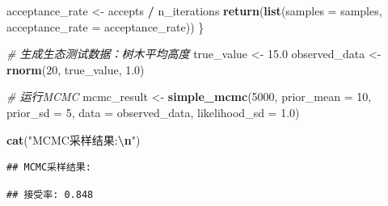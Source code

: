 \documentclass[
  twoside]{book}
\newenvironment{Shaded}{\begin{snugshade}}{\end{snugshade}}
\newcommand{\AttributeTok}[1]{\textcolor[rgb]{0.13,0.29,0.53}{#1}}
\newcommand{\CommentTok}[1]{\textcolor[rgb]{0.56,0.35,0.01}{\textit{#1}}}
\newcommand{\DecValTok}[1]{\textcolor[rgb]{0.00,0.00,0.81}{#1}}
\newcommand{\FloatTok}[1]{\textcolor[rgb]{0.00,0.00,0.81}{#1}}
\newcommand{\FunctionTok}[1]{\textcolor[rgb]{0.13,0.29,0.53}{\textbf{#1}}}
\newcommand{\NormalTok}[1]{#1}
\newcommand{\OtherTok}[1]{\textcolor[rgb]{0.56,0.35,0.01}{#1}}
\newcommand{\SpecialCharTok}[1]{\textcolor[rgb]{0.81,0.36,0.00}{\textbf{#1}}}
\newcommand{\StringTok}[1]{\textcolor[rgb]{0.31,0.60,0.02}{#1}}
\begin{document}
\begin{Shaded}
\begin{Highlighting}[]
\NormalTok{  acceptance\_rate }\OtherTok{\textless{}{-}}\NormalTok{ accepts }\SpecialCharTok{/}\NormalTok{ n\_iterations}
  \FunctionTok{return}\NormalTok{(}\FunctionTok{list}\NormalTok{(}\AttributeTok{samples =}\NormalTok{ samples, }\AttributeTok{acceptance\_rate =}\NormalTok{ acceptance\_rate))}
\NormalTok{\}}

\CommentTok{\# 生成生态测试数据：树木平均高度}
\NormalTok{true\_value }\OtherTok{\textless{}{-}} \FloatTok{15.0}
\NormalTok{observed\_data }\OtherTok{\textless{}{-}} \FunctionTok{rnorm}\NormalTok{(}\DecValTok{20}\NormalTok{, true\_value, }\FloatTok{1.0}\NormalTok{)}

\CommentTok{\# 运行MCMC}
\NormalTok{mcmc\_result }\OtherTok{\textless{}{-}} \FunctionTok{simple\_mcmc}\NormalTok{(}\DecValTok{5000}\NormalTok{, }\AttributeTok{prior\_mean =} \DecValTok{10}\NormalTok{, }\AttributeTok{prior\_sd =} \DecValTok{5}\NormalTok{,}
                           \AttributeTok{data =}\NormalTok{ observed\_data, }\AttributeTok{likelihood\_sd =} \FloatTok{1.0}\NormalTok{)}

\FunctionTok{cat}\NormalTok{(}\StringTok{"MCMC采样结果:}\SpecialCharTok{\textbackslash{}n}\StringTok{"}\NormalTok{)}
\end{Highlighting}
\end{Shaded}

\begin{verbatim}
## MCMC采样结果:
\end{verbatim}

\begin{Shaded}
\end{Shaded}

\begin{verbatim}
## 接受率: 0.848
\end{verbatim}

\begin{Shaded}
\end{Shaded}
\end{document}
